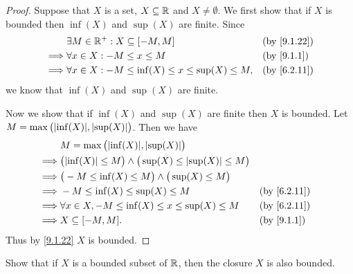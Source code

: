 \begin{proof}
  Suppose that \(X\) is a set, \(X \subseteq \mathbb{R}\) and \(X \neq \emptyset\).
  We first show that if \(X\) is bounded then \(\inf(X)\) and \(\sup(X)\) are finite.
  Since
  \begin{align*}
             & \exists M \in \R^+ : X \subseteq [-M, M]                      &  & \by{9.1.22} \\
    \implies & \forall x \in X : -M \leq x \leq M                            &  & \by{9.1.1}  \\
    \implies & \forall x \in X : -M \leq \inf(X) \leq x \leq \sup(X) \leq M, &  & \by{6.2.11}
  \end{align*}
  we know that \(\inf(X)\) and \(\sup(X)\) are finite.

  Now we show that if \(\inf(X)\) and \(\sup(X)\) are finite then \(X\) is bounded.
  Let \(M = \max\big(\abs{\inf(X)}, \abs{\sup(X)}\big)\).
  Then we have
  \begin{align*}
             & M = \max\big(\abs{\inf(X)}, \abs{\sup(X)}\big)                                                    \\
    \implies & \big(\abs{\inf(X)} \leq M\big) \land \big(\sup(X) \leq \abs{\sup(X)} \leq M\big)                  \\
    \implies & \big(-M \leq \inf(X) \leq M\big) \land \big(\sup(X) \leq M\big)                                   \\
    \implies & -M \leq \inf(X) \leq \sup(X) \leq M                                              &  & \by{6.2.11} \\
    \implies & \forall x \in X, -M \leq \inf(X) \leq x \leq \sup(X) \leq M                      &  & \by{6.2.11} \\
    \implies & X \subseteq [-M, M].                                                             &  & \by{9.1.1}
  \end{align*}
  Thus by \cref{9.1.22} \(X\) is bounded.
\end{proof}

\begin{ex}\label{ex:9.1.11}
  Show that if \(X\) is a bounded subset of \(\mathbb{R}\), then the closure \(X\) is also bounded.
\end{ex}

